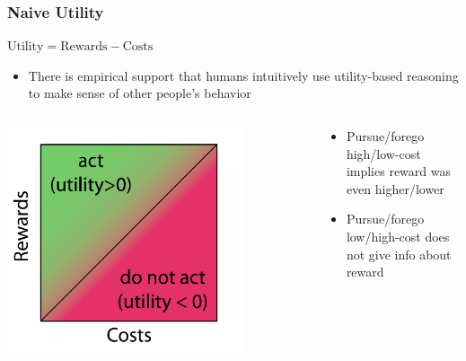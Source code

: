 \documentclass{beamer}
\begin{document}
\begin{frame}
\frametitle{Naive Utility}
\begin{center}
\Large $\text{Utility} = \text{Rewards} - \text{Costs}$
\end{center}
\vspace{0.5cm}
\begin{itemize}
    \item There is empirical support that humans intuitively use utility-based reasoning to make sense of other people's behavior
\end{itemize}
\pause

\vspace{0.5cm}
\begin{columns}
\begin{column}{0.5\textwidth}
\begin{center}
\includegraphics[width=0.8\textwidth]{utility1.png}
\end{center}
\end{column}
\begin{column}{0.5\textwidth}
\pause
\begin{itemize}
    \item Pursue/forego high/low-cost implies reward was even higher/lower
    \pause
    \item Pursue/forego low/high-cost does not give info about reward
\end{itemize}
\end{column}
\end{columns}
\end{frame}
\end{document}

